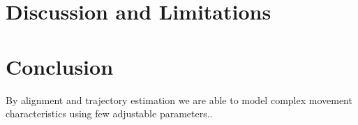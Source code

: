 \section{Discussion and Limitations}
\blindtext

\section{Conclusion}
By alignment and trajectory estimation we are able to model complex movement characteristics using few adjustable parameters..
\blindtext


